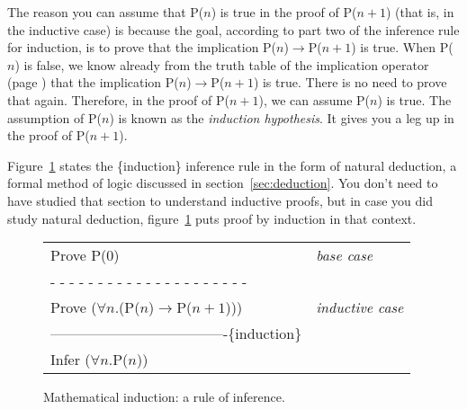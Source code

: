 The reason you can assume that P($n$) is true in the proof of P($n+1$)
(that is, in the inductive case)
is because the goal, according to part two of the inference rule
for induction, is to prove that the implication
P($n$)$\rightarrow$P($n+1$) is true.
When P($n$) is false, we know already from the truth table
of the implication operator (page \pageref{implication-truth-table})
that the implication P($n$)$\rightarrow$P($n+1$) is true.
There is no need to prove that again.
Therefore, in the proof of P($n+1$), we can assume P($n$) is true.
The assumption of P($n$) is known as the
\emph{induction hypothesis}.
It gives you a leg up in the proof of P($n+1$).

Figure~\ref{induction-rule} states the \{induction\} inference rule
in the form of natural deduction, a formal method of logic discussed
in section~\ref{sec:deduction}. You don't need to have studied that
section to understand inductive proofs, but in case you did study
natural deduction, figure~\ref{induction-rule} puts proof by
induction in that context.

\begin{figure}
\begin{spacing}{0.9}
\begin{tabular}{ll}
Prove P(0)                                         &\emph{base case}\\
 - - - - - - - - - - - - - - - - - - - - -         &\\
Prove ($\forall$$n$.(P($n$)$\rightarrow$P($n+1$))) &\emph{inductive case}\\
-------------------------------------\{induction\} &\\
Infer ($\forall$$n$.P($n$))                        &\\
\end{tabular}
\end{spacing}
\caption{Mathematical induction: a rule of inference.}
\label{fig-04-01}\label{induction-rule}
\end{figure}


